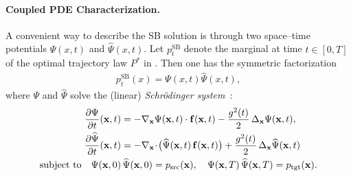 \paragraph{Coupled PDE Characterization.}  
A convenient way to describe the SB solution is through two 
space–time potentials $\Psi(x,t)$ and $\widehat{\Psi}(x,t)$. Let
$p_t^{\mathrm{SB}}$ denote the marginal at time $t\in[0,T]$ of the optimal
trajectory law $P^*$ in . Then one has the
symmetric factorization~\citep{dai1991stochastic}
\begin{align}\label{eq:sb-symmetry}
p_t^{\mathrm{SB}}(x) = \Psi(x,t) \widehat{\Psi}(x,t),
\end{align}
where $\Psi$ and $\widehat{\Psi}$ solve the (linear) \emph{Schrödinger system}~\citep{caluya2021wasserstein,chen2021stochastic,chenlikelihood}:
\begin{align}
\begin{aligned}\label{eq:pde-schrodinger}
\frac{\partial \Psi}{\partial t}(\mathbf{x},t)
  &= -\nabla_{\mathbf{x}} \Psi(\mathbf{x},t) \cdot {\mathbf{f}}(\mathbf{x},t)
     - \frac{g^2(t)}{2}\,\Delta_\mathbf{x} \Psi(\mathbf{x},t),  \\
\frac{\partial \widehat{\Psi}}{\partial t}(\mathbf{x},t)
  &= -\nabla_{\mathbf{x}}\!\cdot\!\bigl(\widehat{\Psi}(\mathbf{x},t)\,{\mathbf{f}}(\mathbf{x},t)\bigr)
     + \frac{g^2(t)}{2}\,\Delta_\mathbf{x}\widehat{\Psi}(\mathbf{x},t) 
\\ \text{subject to}\quad
\Psi(\mathbf{x},0)&\,\widehat{\Psi}(\mathbf{x},0) = p_{\mathrm{src}}(\mathbf{x}),
\quad
\Psi(\mathbf{x},T)\,\widehat{\Psi}(\mathbf{x},T) = p_{\mathrm{tgt}}(\mathbf{x}). 
\end{aligned}
\end{align}

